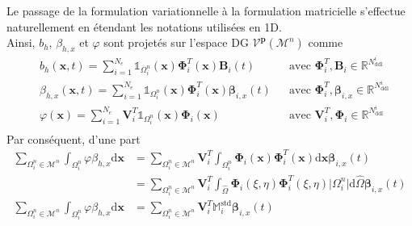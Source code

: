 \documentclass[11pt, a4paper, oneside]{report}
\begin{document}
Le passage de la formulation variationnelle à la formulation matricielle s'effectue naturellement en étendant les notations utilisées en 1D. \\
Ainsi, $b_h$, $\beta_{h, x}$ et $\varphi$ sont projetés sur l'espace DG $\mathcal{V}^\mathbf{p}(\mathcal{M}^n)$ comme
\begin{equation} \label{eq:Projection_DG_Exner_2D}
    \begin{aligned}
        & b_h(\bm{x}, t) = \sum_{i = 1}^{N_e} \mathds{1}_{\Omega_i^n}(\bm{x}) \bm{\Phi}_i^T(\bm{x}) \bm{B}_i(t) &&\text{avec } \bm{\Phi}_i^T, \bm{B}_i \in \mathbb{R}^{N_\text{ddl}^i} \\
        & \beta_{h, x} (\bm{x}, t) = \sum_{i = 1}^{N_e} \mathds{1}_{\Omega_i^n}(\bm{x}) \bm{\Phi}_i^T(\bm{x}) \bm{\beta}_{i, x}(t) &&\text{avec } \bm{\Phi}_i^T, \bm{\beta}_{i, x} \in \mathbb{R}^{N_\text{ddl}^i} \\
        & \varphi(\bm{x}) = \sum_{i = 1}^{N_e} \bm{V}_i^T \mathds{1}_{\Omega_i^n}(\bm{x}) \bm{\Phi}_i(\bm{x}) &&\text{avec } \bm{V}_i^T, \bm{\Phi}_i \in \mathbb{R}^{N_\text{ddl}^i} \\
    \end{aligned}
\end{equation}
Par conséquent, d'une part
\begin{equation}
    \begin{aligned}
        \sum_{\Omega_i^n \in \mathcal{M}^n} \int_{\Omega_i^n} \varphi \beta_{h, x} \text{d}\bm{x} & = \sum_{\Omega_i^n \in \mathcal{M}^n} \bm{V}_i^T \int_{\Omega_i^n} \bm{\Phi}_i(\bm{x}) \bm{\Phi}_i^T(\bm{x}) \text{d}\bm{x} \bm{\beta}_{i, x}(t) \\
        & = \sum_{\Omega_i^n \in \mathcal{M}^n} \bm{V}_i^T \int_{\widehat{\Omega}} \bm{\Phi}_i(\xi, \eta) \bm{\Phi}_i^T(\xi, \eta) \lvert \Omega_i^n \rvert \text{d}\widehat{\Omega} \bm{\beta}_{i, x}(t) \\
        \sum_{\Omega_i^n \in \mathcal{M}^n} \int_{\Omega_i^n} \varphi \beta_{h, x} \text{d}\bm{x} & = \sum_{\Omega_i^n \in \mathcal{M}^n} \bm{V}_i^T \mathbb{M}_i^\text{std} \bm{\beta}_{i, x}(t)
    \end{aligned}
\end{equation}
\end{document}
